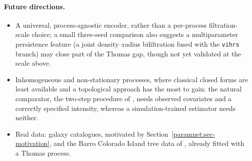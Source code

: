 \documentclass[11pt,a4paper]{article}
\theoremstyle{definitioncolon}
\begin{document}
\paragraph{Future directions.}
\begin{itemize}[leftmargin=*,itemsep=1pt,topsep=2pt]
\item A universal, process-agnostic encoder, rather than a per-process
    filtration-scale choice; a small three-seed comparison also suggests a
    multiparameter persistence feature (a joint density--radius
    bifiltration fused with the \texttt{vihrs} branch) may close part of
    the Thomas gap, though not yet validated at the scale above.
\item Inhomogeneous and non-stationary processes, where classical closed
    forms are least available and a topological approach has the most to
    gain: the natural comparator, the two-step procedure of
    \citet{waagepetersen2009twostep}, needs observed covariates and a
    correctly specified intensity, whereas a simulation-trained estimator
    needs neither.
\item Real data: galaxy catalogues, motivated by
    Section~\ref{paramnet:sec-motivation}, and the Barro Colorado Island
    tree data of \citet{waagepetersen2009twostep}, already fitted with a
    Thomas process.
\end{itemize}
\end{document}
